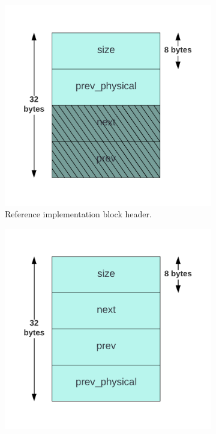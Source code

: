\begin{figure}[H]
    \centering
    \begin{subfigure}[b]{0.3\textwidth}
        \centering
        \includegraphics[width=\textwidth]{figures/blockheader_adap_reference.png}
        \caption{Reference implementation block header.}
        \label{fig:blockheader_adap_reference}
    \end{subfigure}%
    \hfill
    \begin{subfigure}[b]{0.3\textwidth}
        \centering
        \includegraphics[width=\textwidth]{figures/blockheader_adap_general.png}

\end{subfigure}
\end{figure}
